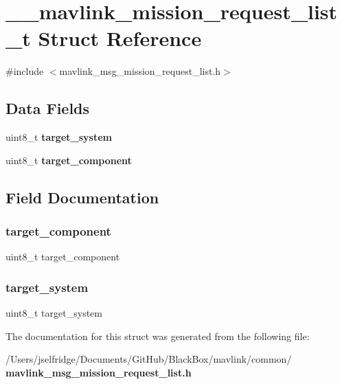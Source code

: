 \section{\+\_\+\+\_\+mavlink\+\_\+mission\+\_\+request\+\_\+list\+\_\+t Struct Reference}
\label{struct____mavlink__mission__request__list__t}


{\ttfamily \#include $<$mavlink\+\_\+msg\+\_\+mission\+\_\+request\+\_\+list.\+h$>$}

\subsection*{Data Fields}
\begin{DoxyCompactItemize}
\item 
uint8\+\_\+t \textbf{ target\+\_\+system}
\item 
uint8\+\_\+t \textbf{ target\+\_\+component}
\end{DoxyCompactItemize}


\subsection{Field Documentation}
\mbox{\label{struct____mavlink__mission__request__list__t_a1763123cfc5fa7f9c51ec44947d5790f}} 
\subsubsection{target\+\_\+component}
{\footnotesize\ttfamily uint8\+\_\+t target\+\_\+component}

\mbox{\label{struct____mavlink__mission__request__list__t_ac9afff43526a157e4c4e45607c1418b8}} 
\subsubsection{target\+\_\+system}
{\footnotesize\ttfamily uint8\+\_\+t target\+\_\+system}



The documentation for this struct was generated from the following file\+:\begin{DoxyCompactItemize}
\item 
/\+Users/jselfridge/\+Documents/\+Git\+Hub/\+Black\+Box/mavlink/common/\textbf{ mavlink\+\_\+msg\+\_\+mission\+\_\+request\+\_\+list.\+h}\end{DoxyCompactItemize}
